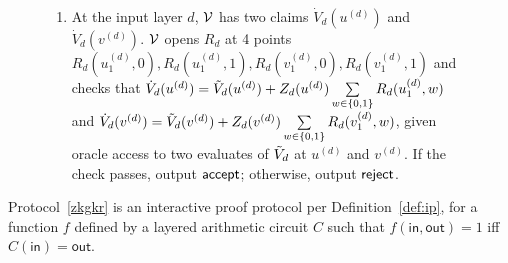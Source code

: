 \begin{figure}[t!]
{{{{\begin{construction}
\begin{enumerate}
\begin{enumerate}
	\item At the end of the zero-knowledge sumcheck protocol, $\P$ sends $\V$ $\dot{V}_{i+1}(u^{(i+1)})$ and $\dot{V}_{i+1}(v^{(i+1)})$.
	
	\item $\V$ computes $a_{i+1} = \alpha^{(i)}\tilde{mult}_{i+1}(u^{(i)}, u^{(i+1)}, v^{(i+1)})+\beta^{(i)}\tilde{mult}_{i+1}(v^{(i)}, u^{(i+1)}, v^{(i+1)})$ and $b_{i+1} = \alpha^{(i)}\tilde{add}_{i+1}(u^{(i)}, u^{(i+1)}, v^{(i+1)})+\beta^{(i)}\tilde{add}_{i+1}(v^{(i)}, u^{(i+1)}, v^{(i+1)})$ locally. $\V$ computes $Z_i(u^{(i)}),Z_i(v^{(i)}),I(\vec{0},c^{(i)}), I((u^{(i+1)},v^{(i+1)}),\vec{0})$ locally.
	\item $\P$ and $\V$ open $R_i$ at two points $R_i(u_1^{(i)},c^{(i)})$ and $R_i(v_1^{(i)},c^{(i)})$ using $\Open$ and $\Verify$.
	\item $\V$ computes the following as the evaluation oracle and uses it to complete the last step of the zero-knowledge sumcheck.
	\begin{align*}
		I(\vec{0},c^{(i)})(a_{i+1}(\dot{V}_{i+1}(u^{(i+1)})\dot{V}_{i+1}(v^{(i+1)}))+b_{i+1}(\dot{V}_{i+1}(u^{(i+1)})+\dot{V}_{i+1}(v^{(i+1)})))\\
		+I((u^{(i+1)},v^{(i+1)}),\vec{0})(\alpha^{(i)}Z_i(u^{(i)})R_i(u_1^{(i)}, c^{(i)})+\beta^{(i)}Z_i(v^{(i)})R_i(v_1^{(i)}, c^{(i)}))
	\end{align*}
	If all checks in the zero knowledge sumcheck and $\Verify$ passes, $\V$ uses $\dot{V}_{i+1}(u^{(i+1)})$ and $\dot{V}_{i+1}(v^{(i+1)})$ to proceed to the $(i+1)$-th layer. Otherwise, $\V$ outputs $\reject$ and aborts.
	
	\end{enumerate}

\item At the input layer $d$, $\V$ has two claims $\dot{V}_{d}(u^{(d)})$ and $\dot{V}_{d}(v^{(d)})$. $\V$ opens $R_d$ at 4 points $R_d(u_1^{(d)},0),R_d(u_1^{(d)},1),R_d(v_1^{(d)},0),R_d(v_1^{(d)},1)$ and checks that $\dot{V}_{d}(u^{(d)}) = \tilde{V}_d(u^{(d)})+Z_d(u^{(d)})\sum\limits_{w \in \{0,1\}}R_d(u_1^{(d)},w)$ and $\dot{V}_{d}(v^{(d)}) = \tilde{V}_d(v^{(d)})+Z_d(v^{(d)})\sum\limits_{w \in \{0,1\}}R_d(v_1^{(d)},w)$, given oracle access to two evaluates of $\tilde{V}_d$ at $u^{(d)}$ and $v^{(d)}$. If the check passes, output $\mathsf{accept}$; otherwise, output $\reject$.

\end{enumerate}
\end{construction}}}}}
\end{figure}
\begin{theorem}
	Protocol~\ref{zkgkr} is an interactive proof protocol per Definition~\ref{def:ip}, for a function $f$ defined by a layered arithmetic circuit $C$ such that $f(\mathsf{in},\mathsf{out}) = 1$ iff $C(\mathsf{in}) = \mathsf{out}$.
\end{theorem}

